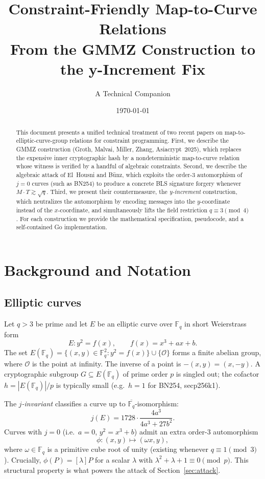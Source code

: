 \documentclass[11pt,a4paper]{article}
\title{\bfseries Constraint-Friendly Map-to-Curve Relations\\
\large From the GMMZ Construction to the y-Increment Fix}
\author{A Technical Companion}
\date{\today}
\theoremstyle{definition}
\newcommand{\F}{\mathbb{F}}
\begin{document}
\maketitle

\begin{abstract}
This document presents a unified technical treatment of two recent papers on
map-to-elliptic-curve-group relations for constraint programming. First, we
describe the GMMZ construction (Groth, Malvai, Miller, Zhang, Asiacrypt~2025),
which replaces the expensive inner cryptographic hash by a nondeterministic
map-to-curve relation whose witness is verified by a handful of algebraic
constraints. Second, we describe the algebraic attack of El~Housni and Bünz,
which exploits the order-3 automorphism of $j=0$ curves (such as BN254) to
produce a concrete BLS signature forgery whenever $M \cdot T \gtrsim \sqrt{q}$.
Third, we present their countermeasure, the \emph{y-increment} construction,
which neutralizes the automorphism by encoding messages into the $y$-coordinate
instead of the $x$-coordinate, and simultaneously lifts the field restriction
$q \equiv 3 \pmod 4$. For each construction we provide the mathematical
specification, pseudocode, and a self-contained Go implementation.
\end{abstract}

\tableofcontents

\section{Background and Notation}

\subsection{Elliptic curves}

Let $q > 3$ be prime and let $E$ be an elliptic curve over $\F_q$ in short
Weierstrass form
\[
  E : y^2 = f(x), \qquad f(x) = x^3 + ax + b.
\]
The set $E(\F_q) = \{(x,y) \in \F_q^2 : y^2 = f(x)\} \cup \{\mathcal{O}\}$
forms a finite abelian group, where $\mathcal{O}$ is the point at infinity.
The inverse of a point is $-(x,y) = (x,-y)$. A cryptographic subgroup
$G \subseteq E(\F_q)$ of prime order $p$ is singled out; the cofactor
$h = |E(\F_q)|/p$ is typically small (e.g.\ $h = 1$ for BN254, secp256k1).

The \emph{$j$-invariant} classifies a curve up to $\overline{\F_q}$-isomorphism:
\[
  j(E) = 1728 \cdot \frac{4a^3}{4a^3 + 27 b^2}.
\]
Curves with $j=0$ (i.e.\ $a=0$, $y^2 = x^3+b$) admit an extra order-3
automorphism
\[
  \phi : (x,y) \mapsto (\omega x, y),
\]
where $\omega \in \F_q$ is a primitive cube root of unity (existing whenever
$q \equiv 1 \pmod 3$). Crucially, $\phi(P) = [\lambda] P$ for a scalar
$\lambda$ with $\lambda^2 + \lambda + 1 \equiv 0 \pmod p$. This structural
property is what powers the attack of Section~\ref{sec:attack}.
\end{document}
